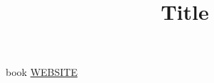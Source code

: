\documentclass[withoutpreface,bwprint]{cumcmthesis}
\title{Title}
\begin{document}
 \maketitle
\renewcommand{\abstractname}{Abstract}
\renewcommand{\keywords}{\textbf{Keywords：}}
\begin{abstract}
\begin{spacing}{1.6}

\end{spacing}
\large


\end{abstract}

\newpage
{
	\tableofcontents
}
\newpage

%

 





\newpage
\begin{thebibliography}{99}
 book
 \url{WEBSITE}
\end{thebibliography}

%
%
%

\newpage

\end{document}
